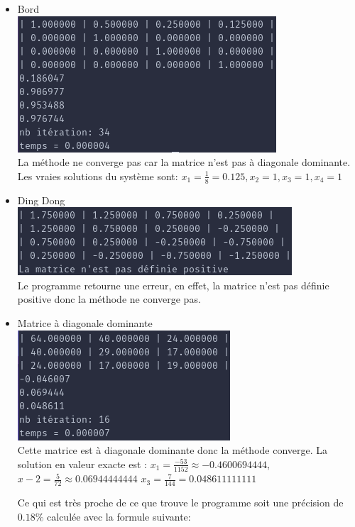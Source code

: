 \documentclass[a4paper]{article}
\begin{document}
\begin{itemize}
\item Bord \\
  \includegraphics[scale=0.5]{./img/cholesky/bord.png} \\
  La méthode ne converge pas car la matrice n'est pas à diagonale dominante. Les
  vraies solutions du système sont:
  $x_{1} = \frac{1}{8} = 0.125 , x_{2} = 1 , x_{3} = 1 , x_{4} = 1$
\item Ding Dong \\
  \includegraphics[scale=0.5]{./img/cholesky/ding_dong.png} \\
  Le programme retourne une erreur, en effet, la matrice n'est pas définie
  positive donc la méthode ne converge pas.
\item Matrice à diagonale dominante \\
  \includegraphics[scale=0.5]{./img/cholesky/chocho_test_final.png} \\
  Cette matrice est à diagonale dominante donc la méthode converge. La solution
  en valeur exacte est :
  \quad$x_{1} = \frac{-53}{1152} \approx -0.4600694444$,
  \quad$x-{2} = \frac{5}{72} \approx 0.06944444444$
  \quad$x_{3} = \frac{7}{144} = 0.048611111111$
  
  Ce qui est très proche de ce que trouve le programme soit une
  précision de $0.18\%$ calculée avec la formule suivante:
  

\end{itemize}
\end{document}
